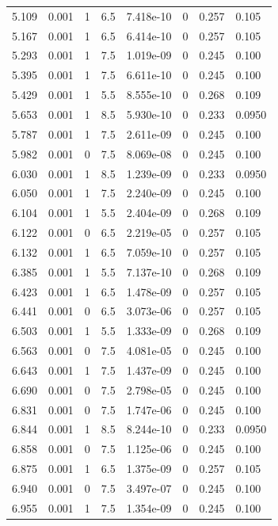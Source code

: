 \documentclass[preview]{standalone}
\begin{document}
{{\begin{tabular}{L{1.2cm}C{1.2cm} C{0.3cm}C{0.5cm} C{1.4cm}C{1.4cm} C{1.4cm}C{1.4cm}}
  5.109  &  0.001  & 1     & 6.5 &  7.418e-10  & 0  & 0.257 &  0.105   \\ 
  5.167  &  0.001  & 1     & 6.5 &  6.414e-10  & 0  & 0.257 &  0.105   \\ 
  5.293  &  0.001  & 1     & 7.5 &  1.019e-09  & 0  & 0.245 &  0.100   \\ 
  5.395  &  0.001  & 1     & 7.5 &  6.611e-10  & 0  & 0.245 &  0.100   \\ 
  5.429  &  0.001  & 1     & 5.5 &  8.555e-10  & 0  & 0.268 &  0.109   \\ 
  5.653  &  0.001  & 1     & 8.5 &  5.930e-10  & 0  & 0.233 &  0.0950   \\ 
  5.787  &  0.001  & 1     & 7.5 &  2.611e-09  & 0  & 0.245 &  0.100   \\ 
  5.982  &  0.001  & 0     & 7.5 &  8.069e-08  & 0  & 0.245 &  0.100   \\ 
  6.030  &  0.001  & 1     & 8.5 &  1.239e-09  & 0  & 0.233 &  0.0950   \\ 
  6.050  &  0.001  & 1     & 7.5 &  2.240e-09  & 0  & 0.245 &  0.100   \\ 
  6.104  &  0.001  & 1     & 5.5 &  2.404e-09  & 0  & 0.268 &  0.109   \\ 
  6.122  &  0.001  & 0     & 6.5 &  2.219e-05  & 0  & 0.257 &  0.105   \\ 
  6.132  &  0.001  & 1     & 6.5 &  7.059e-10  & 0  & 0.257 &  0.105   \\ 
  6.385  &  0.001  & 1     & 5.5 &  7.137e-10  & 0  & 0.268 &  0.109   \\ 
  6.423  &  0.001  & 1     & 6.5 &  1.478e-09  & 0  & 0.257 &  0.105   \\ 
  6.441  &  0.001  & 0     & 6.5 &  3.073e-06  & 0  & 0.257 &  0.105   \\ 
  6.503  &  0.001  & 1     & 5.5 &  1.333e-09  & 0  & 0.268 &  0.109   \\ 
  6.563  &  0.001  & 0     & 7.5 &  4.081e-05  & 0  & 0.245 &  0.100   \\ 
  6.643  &  0.001  & 1     & 7.5 &  1.437e-09  & 0  & 0.245 &  0.100   \\ 
  6.690  &  0.001  & 0     & 7.5 &  2.798e-05  & 0  & 0.245 &  0.100   \\ 
  6.831  &  0.001  & 0     & 7.5 &  1.747e-06  & 0  & 0.245 &  0.100   \\ 
  6.844  &  0.001  & 1     & 8.5 &  8.244e-10  & 0  & 0.233 &  0.0950   \\ 
  6.858  &  0.001  & 0     & 7.5 &  1.125e-06  & 0  & 0.245 &  0.100   \\ 
  6.875  &  0.001  & 1     & 6.5 &  1.375e-09  & 0  & 0.257 &  0.105   \\ 
  6.940  &  0.001  & 0     & 7.5 &  3.497e-07  & 0  & 0.245 &  0.100   \\ 
  6.955  &  0.001  & 1     & 7.5 &  1.354e-09  & 0  & 0.245 &  0.100   \\ 
\hline 
\end{tabular} 

}}
\end{document}
